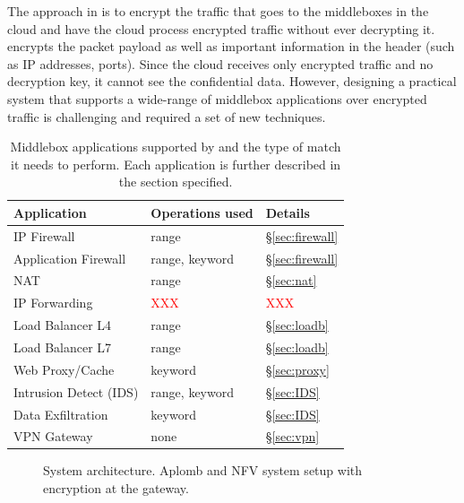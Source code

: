     The approach in \sys is to encrypt the traffic that goes to  the middleboxes in the cloud and have the cloud process encrypted traffic without ever decrypting it. \sys encrypts the packet payload as well as important information in the header (such as IP addresses, ports). Since the cloud receives only encrypted traffic and no decryption key, it cannot see the confidential data. However, designing a practical system that supports a wide-range of middlebox applications over encrypted traffic is challenging and required a set of new techniques.
    
    
    
    
\begin{table}[t!]
\centering
\begin{tabular}{p{3.2cm}|p{2.9cm}|p{1cm}}
{\bf Application}  & {\bf Operations used} & {\bf Details} \\
\hline \hline
IP Firewall &   range  & \S\ref{sec:firewall} \\
Application Firewall & range, keyword  & \S\ref{sec:firewall}\\
NAT & range  & \S\ref{sec:nat} \\
IP Forwarding  & \textcolor{red}{XXX} &  \textcolor{red}{XXX} \\
Load Balancer L4 & range & \S\ref{sec:loadb}\\
Load Balancer L7  & range & \S\ref{sec:loadb}\\
Web Proxy/Cache  & keyword & \S\ref{sec:proxy}\\
Intrusion Detect (IDS)  & range, keyword & \S\ref{sec:IDS}\\
Data Exfiltration  & keyword & \S\ref{sec:IDS} \\
VPN Gateway &  none & \S\ref{sec:vpn} \\ 
\end{tabular}
\caption{Middlebox applications supported by \sys and the type of match it needs to perform. Each application is further described in the section specified. \label{tab:apps-ops} }
\end{table}


\begin{figure}[t!]
\centering
{}
%
\hfill  
{}
     
\caption{System architecture. Aplomb and NFV system setup with \sys encryption  at the gateway. \label{fig:sys-overview}}
\end{figure}

